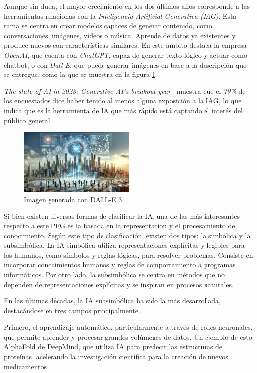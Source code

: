 Aunque sin duda, el mayor crecimiento en los dos últimos años corresponde a las herramientas relacionas con la \textit{Inteligencia Artificial Generativa (IAG)}. Esta rama se centra en crear modelos capaces de generar contenido, como conversaciones, imágenes, vídeos o música. Aprende de datos ya existentes y produce nuevos con características similares. En este ámbito destaca la empresa \textit{OpenAI}, que cuenta con \textit{ChatGPT}, capaz de generar texto lógico y actuar como chatbot, o con \textit{Dall-E}, que puede generar imágenes en base a la descripción que se entregue, como la que se muestra en la figura \ref{fig:dall-e}.

\textit{The state of AI in 2023: Generative AI's breakout year}~\cite{mckinsey2023state} muestra que el \textit{79\%} de los encuestados dice haber tenido al menos alguna exposición a la IAG, lo que indica que es la herramienta de IA que más rápido está captando el interés del público general.

\begin{figure}[H]
    \centering
    \includegraphics[width=0.5\textwidth]{figures/dall-e.png}
    \caption{Imagen generada con DALL-E 3.}
    \label{fig:dall-e}
\end{figure}

Si bien existen diversas formas de clasificar la IA, una de las más interesantes respecto a este PFG es la basada en la representación y el procesamiento del conocimiento. Según este tipo de clasificación, existen dos tipos: la simbólica y la subsimbólica. La IA simbólica utiliza representaciones explícitas y legibles para los humanos, como símbolos y reglas lógicas, para resolver problemas. Consiste en incorporar conocimientos humanos y reglas de comportamiento a programas informáticos. Por otro lado, la subsimbólica se centra en métodos que no dependen de representaciones explícitas y se inspiran en procesos naturales.

En las últimas décadas, la IA subsimbólica ha sido la más desarrollada, destacándose en tres campos principalmente.

Primero, el aprendizaje automático, particularmente a través de redes neuronales, que permite aprender y procesar grandes volúmenes de datos. Un ejemplo de esto AlphaFold de DeepMind, que utiliza IA para predecir las estructuras de proteínas, acelerando la investigación científica para la creación de nuevos medicamentos~\cite{AlphaFold2024}.

